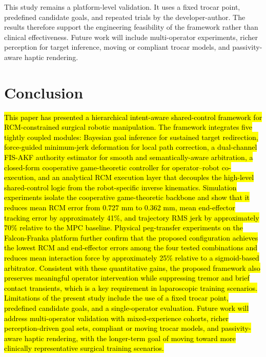 \documentclass[conference]{IEEEtran}
\begin{document}
This study remains a platform-level validation. It uses a fixed trocar point, predefined candidate goals, and repeated trials by the developer-author. The results therefore support the engineering feasibility of the framework rather than clinical effectiveness. Future work will include multi-operator experiments, richer perception for target inference, moving or compliant trocar models, and passivity-aware haptic rendering.

\section{Conclusion}
\hl{This paper has presented a hierarchical intent-aware shared-control framework for RCM-constrained surgical robotic manipulation. The framework integrates five tightly coupled modules: Bayesian goal inference for sustained target redirection, force-guided minimum-jerk deformation for local path correction, a dual-channel FIS-AKF authority estimator for smooth and semantically-aware arbitration, a closed-form cooperative game-theoretic controller for operator--robot co-execution, and an analytical RCM execution layer that decouples the high-level shared-control logic from the robot-specific inverse kinematics. Simulation experiments isolate the cooperative game-theoretic backbone and show that it reduces mean RCM error from 0.727 mm to 0.362 mm, mean end-effector tracking error by approximately 41\%, and trajectory RMS jerk by approximately 70\% relative to the MPC baseline. Physical peg-transfer experiments on the Falcon-Franka platform further confirm that the proposed configuration achieves the lowest RCM and end-effector errors among the four tested combinations and reduces mean interaction force by approximately 25\% relative to a sigmoid-based arbitrator. Consistent with these quantitative gains, the proposed framework also preserves meaningful operator intervention while suppressing tremor and brief contact transients, which is a key requirement in laparoscopic training scenarios. Limitations of the present study include the use of a fixed trocar point, predefined candidate goals, and a single-operator evaluation. Future work will address multi-operator validation with mixed-experience cohorts, richer perception-driven goal sets, compliant or moving trocar models, and passivity-aware haptic rendering, with the longer-term goal of moving toward more clinically representative surgical training scenarios.}
\end{document}
